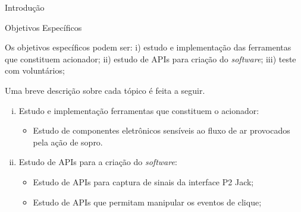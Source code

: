 \begin{chapter}{Introdução}


\begin{subsection}{Objetivos Específicos}

Os objetivos específicos podem ser:
i) estudo e implementação das ferramentas que constituem acionador;
ii) estudo de APIs para criação do \textit{software};
iii) teste com voluntários;

Uma breve descrição sobre cada tópico é feita a seguir.

\begin{enumerate}[i)]

\setlength\itemsep{-.2cm}
	\item Estudo e implementação ferramentas que constituem o acionador: \vspace{-.2cm}
	\begin{itemize}
		\item Estudo de componentes eletrônicos sensíveis ao fluxo de ar
provocados pela ação de sopro.
	\end{itemize}

	\item Estudo de APIs para a criação do \textit{software}: \vspace{-.2cm}
	\begin{itemize}
		\item Estudo de APIs para captura de sinais da interface P2 Jack;
		\item Estudo de APIs que permitam manipular os eventos de clique;
	\end{itemize}


\end{enumerate}
\end{subsection}
\end{chapter}
